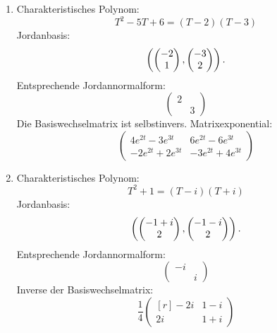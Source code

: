 \documentclass[a4paper, 10pt]{scrartcl}
\begin{document}
\begin{solution}
  \begin{enumerate}[leftmargin=*]
    \item
      Charakteristisches Polynom:
      \[
        T^2 - 5T + 6 = (T-2)(T-3)
      \]
      Jordanbasis:
      \[
        \left( \begin{pmatrix} -2 \\ 1 \end{pmatrix}, \begin{pmatrix} -3 \\ 2 \end{pmatrix} \right).
      \]
      Entsprechende Jordannormalform:
      \[
        \begin{pmatrix}
          2 &   \\
            & 3
        \end{pmatrix}
      \]
      Die Basiswechselmatrix ist selbstinvers.
      Matrixexponential:
      \[
        \begin{pmatrix}
           4 e^{2t} - 3 e^{3t}  &  6 e^{2t} - 6 e^{3t}  \\
          -2 e^{2t} + 2 e^{3t}  & -3 e^{2t} + 4 e^{3t}
        \end{pmatrix}
      \]
    \item
      Charakteristisches Polynom:
      \[
        T^2 + 1 = (T-i)(T+i)
      \]
      Jordanbasis:
      \[
        \left( \begin{pmatrix} -1+i \\ 2 \end{pmatrix}, \begin{pmatrix} -1-i \\ 2 \end{pmatrix} \right).
      \]
      Entsprechende Jordannormalform:
      \[
        \begin{pmatrix}
          -i  &   \\
              & i 
        \end{pmatrix}
      \]
      Inverse der Basiswechselmatrix:
      \[
        \frac{1}{4}
        \begin{pmatrix*}[r]
          -2i & 1-i \\
           2i & 1+i
        \end{pmatrix*}
      \]


\end{enumerate}
\end{solution}
\end{document}
